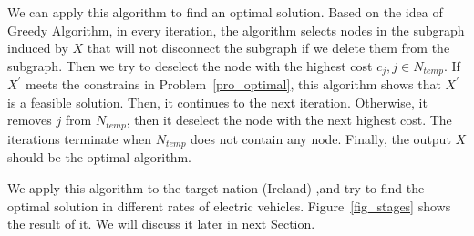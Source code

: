 We can apply this algorithm to find an optimal solution.
Based on the idea of Greedy Algorithm,
in every iteration,
the algorithm selects nodes in the subgraph induced by $X$ that will not disconnect the subgraph if we delete them from the subgraph.
Then we try to deselect the node with the highest cost $c_j, j \in N_{temp}$.
If $X^{'}$ meets the constrains in Problem~\ref{pro_optimal},
this algorithm shows that $X^{'}$ is a feasible solution.
Then, it continues to the next iteration.
Otherwise, it removes $j$ from $N_{temp}$,
then it deselect the node with the next highest cost.
The iterations terminate when $N_{temp}$ does not contain any node.
Finally, the output $X$ should be the optimal algorithm.

We apply this algorithm to the target nation (Ireland) 
,and try to find the optimal solution in different rates of electric vehicles.
Figure~\ref{fig_stages} shows the result of it.
We will discuss it later in next Section.

